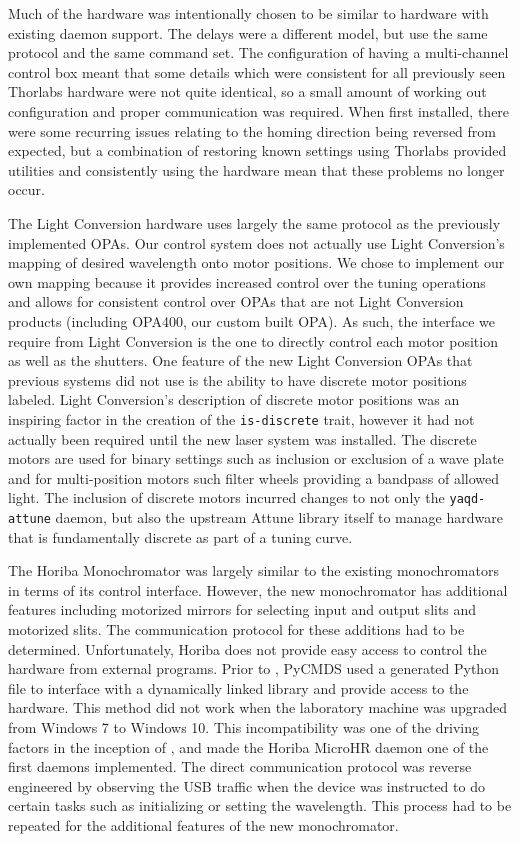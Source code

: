 Much of the hardware was intentionally chosen to be similar to hardware with existing \yaq{} daemon support.
The delays were a different model, but use the same protocol and the same command set.
The configuration of having a multi-channel control box meant that some details which were consistent for all previously seen Thorlabs hardware were not quite identical, so a small amount of working out configuration and proper communication was required.
When first installed, there were some recurring issues relating to the homing direction being reversed from expected, but a combination of restoring known settings using Thorlabs provided utilities and consistently using the hardware mean that these problems no longer occur.

The Light Conversion hardware uses largely the same protocol as the previously implemented OPAs.
Our control system does not actually use Light Conversion's mapping of desired wavelength onto motor positions.
We chose to implement our own mapping because it provides increased control over the tuning operations and allows for consistent control over OPAs that are not Light Conversion products (including OPA400, our custom built OPA).
As such, the interface we require from Light Conversion is the one to directly control each motor position as well as the shutters.
One feature of the new Light Conversion OPAs that previous systems did not use is the ability to have discrete motor positions labeled.
Light Conversion's description of discrete motor positions was an inspiring factor in the creation of the \texttt{is-discrete} \yaq{} trait, however it had not actually been required until the new laser system was installed.
The discrete motors are used for binary settings such as inclusion or exclusion of a wave plate and for multi-position motors such filter wheels providing a bandpass of allowed light.
The inclusion of discrete motors incurred changes to not only the \texttt{yaqd-attune}\cite{} daemon, but also the upstream Attune library itself to manage hardware that is fundamentally discrete as part of a tuning curve.

The Horiba Monochromator was largely similar to the existing monochromators in terms of its control interface.
However, the new monochromator has additional features including motorized mirrors for selecting input and output slits and motorized slits.
The communication protocol for these additions had to be determined.
Unfortunately, Horiba does not provide easy access to control the hardware from external programs.
Prior to \yaq{}, PyCMDS used a generated Python file to interface with a dynamically linked library and provide access to the hardware.
This method did not work when the laboratory machine was upgraded from Windows 7 to Windows 10.
This incompatibility was one of the driving factors in the inception of \yaq{}, and made the Horiba MicroHR daemon one of the first daemons implemented.
The direct communication protocol was reverse engineered by observing the USB traffic when the device was instructed to do certain tasks such as initializing or setting the wavelength.
This process had to be repeated for the additional features of the new monochromator.

